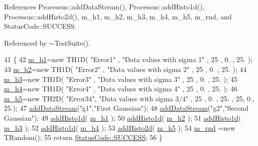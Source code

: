 References Processus\+::add\+Data\+Stream(), Processus\+::add\+Histo1d(), Processus\+::add\+Histo2d(), m\+\_\+h1, m\+\_\+h2, m\+\_\+h3, m\+\_\+h4, m\+\_\+h5, m\+\_\+rnd, and Status\+Code\+::\+S\+U\+C\+C\+E\+SS.



Referenced by $\sim$\+Test\+Suite().


\begin{DoxyCode}
41                                    \{
42   \hyperlink{classTestSuite_a8691ed6da0262d0e09d512b58375f94c}{m\_h1}=\textcolor{keyword}{new} TH1D( \textcolor{stringliteral}{"Error1"} , \textcolor{stringliteral}{"Data values with sigma 1"} , 25 , 0. , 25. );
43   \hyperlink{classTestSuite_ad08c4828466d73e1273408ecd3547baf}{m\_h2}=\textcolor{keyword}{new} TH1D( \textcolor{stringliteral}{"Error2"} , \textcolor{stringliteral}{"Data values with sigma 2"} , 25 , 0. , 25. );
44   \hyperlink{classTestSuite_a86ca996cbb37caad3bcc32a138737e27}{m\_h3}=\textcolor{keyword}{new} TH1D( \textcolor{stringliteral}{"Error3"} , \textcolor{stringliteral}{"Data values with sigma 3"} , 25 , 0. , 25. );
45   \hyperlink{classTestSuite_a86739625b47a8ce6ebe2d7fb9f5128e3}{m\_h4}=\textcolor{keyword}{new} TH1D( \textcolor{stringliteral}{"Error4"} , \textcolor{stringliteral}{"Data values with sigma 4"} , 25 , 0. , 25. );
46   \hyperlink{classTestSuite_a384f4680f040072ec87b872bb4778ed6}{m\_h5}=\textcolor{keyword}{new} TH2D( \textcolor{stringliteral}{"Error34"}, \textcolor{stringliteral}{"Data values with sigma 3/4"} , 25 , 0. , 25. , 25, 0., 25.);
47   \hyperlink{classProcessus_a308c8f193802f1d1ab49d4447d0cb281}{addDataStream}(\textcolor{stringliteral}{"g1"},\textcolor{stringliteral}{"First Gaussian"});
48   \hyperlink{classProcessus_a308c8f193802f1d1ab49d4447d0cb281}{addDataStream}(\textcolor{stringliteral}{"g2"},\textcolor{stringliteral}{"Second Gaussian"});
49   \hyperlink{classProcessus_ad46e0d4dfdfdcbce001ee6be1746dfa4}{addHisto1d}( \hyperlink{classTestSuite_a8691ed6da0262d0e09d512b58375f94c}{m\_h1} );
50   \hyperlink{classProcessus_ad46e0d4dfdfdcbce001ee6be1746dfa4}{addHisto1d}( \hyperlink{classTestSuite_ad08c4828466d73e1273408ecd3547baf}{m\_h2} );
51   \hyperlink{classProcessus_ad46e0d4dfdfdcbce001ee6be1746dfa4}{addHisto1d}( \hyperlink{classTestSuite_a86ca996cbb37caad3bcc32a138737e27}{m\_h3} );
52   \hyperlink{classProcessus_ad46e0d4dfdfdcbce001ee6be1746dfa4}{addHisto1d}( \hyperlink{classTestSuite_a86739625b47a8ce6ebe2d7fb9f5128e3}{m\_h4} );
53   \hyperlink{classProcessus_ac1ed1aed5edaeabdf18aa56775440471}{addHisto2d}( \hyperlink{classTestSuite_a384f4680f040072ec87b872bb4778ed6}{m\_h5} );
54   \hyperlink{classTestSuite_a8288c9104c87bfc3934e2b6bffdef66f}{m\_rnd} =\textcolor{keyword}{new} TRandom();
55   \textcolor{keywordflow}{return} \hyperlink{classStatusCode_a6f565cbeadc76d14c72f047e5e85eb4badd0da38d3ba0d922efd1f4619bc37ad8}{StatusCode::SUCCESS};
56 \}
\end{DoxyCode}
\mbox{\label{classTestSuite_aea5b144ea26479d5255efffab4c125f4}} 
